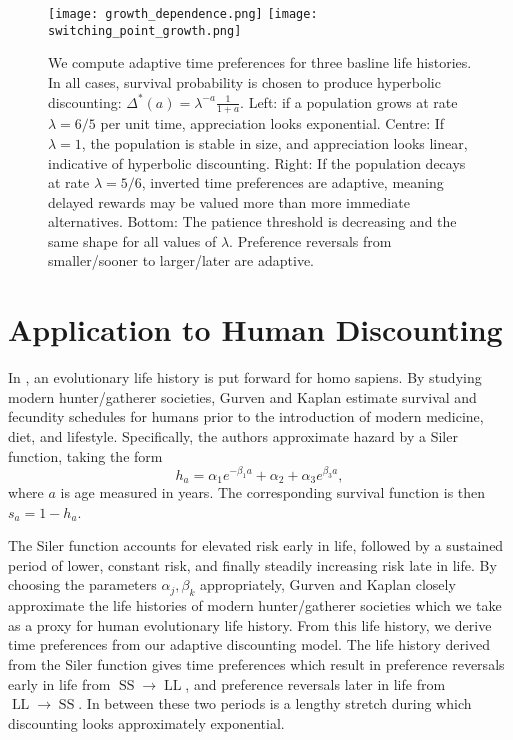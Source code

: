 \documentclass[titlepage, hidelinks, 12pt]{article}
\theoremstyle{plain}
\theoremstyle{remark}
\theoremstyle{definition}
\DeclareMathOperator{\smallersooner}{SS}
\DeclareMathOperator{\largerlater}{LL}
\begin{document}
\begin{figure}[H]
    \centering
    \texttt{[image: growth\_dependence.png]}
    \texttt{[image: switching\_point\_growth.png]}
    \caption[Appreciation and preference plots for different demographic trends.]{We compute adaptive time preferences for three basline life histories. In all cases, survival probability is chosen to 
        produce hyperbolic discounting: $\Delta^*(a) = \lambda^{-a}\frac{1}{1+a}$. 
        Left: if a population grows at rate $\lambda = 6/5$ per unit time, appreciation looks exponential.
        Centre: If $\lambda = 1$, the population is stable in size, and appreciation looks linear, indicative of hyperbolic discounting. Right:
        If the population decays at rate $\lambda = 5/6$, inverted time preferences are adaptive, meaning delayed rewards may be valued more than
        more immediate alternatives. Bottom: The patience threshold is decreasing and the same shape for all values of $\lambda$. Preference reversals
    from smaller/sooner to larger/later are adaptive.}
\end{figure}
\newpage


\section{Application to Human Discounting}
In \cite{gurven07}, an evolutionary life history is put forward for homo sapiens. By studying modern hunter/gatherer societies, Gurven and Kaplan 
estimate survival and fecundity schedules for humans prior to the introduction of modern medicine, diet, and lifestyle. Specifically,
the authors approximate hazard by a Siler function, taking the form
\begin{equation}
    h_a = \alpha_1 e^{-\beta_1 a} + \alpha_2 + \alpha_3 e^{\beta_3 a}, 
    \label{eqn:siler}
\end{equation}
where $a$ is age measured in years. The corresponding survival function is then $s_a = 1 - h_a$. 

The Siler function accounts for elevated risk early in life, followed by a sustained
period of lower, constant risk, and finally steadily increasing risk late in life. By choosing the parameters $\alpha_j, \beta_k$ appropriately,
Gurven and Kaplan closely approximate the life histories of modern hunter/gatherer societies which we take as a proxy for human
evolutionary life history. From this life history, we derive time preferences from our adaptive discounting model. The life history 
derived from the Siler function gives time preferences which 
result in preference reversals early in life from $\smallersooner\to\largerlater$, and preference reversals later in life 
from $\largerlater\to\smallersooner$.
In between these two periods is a lengthy stretch during which discounting looks approximately exponential. 
\end{document}
